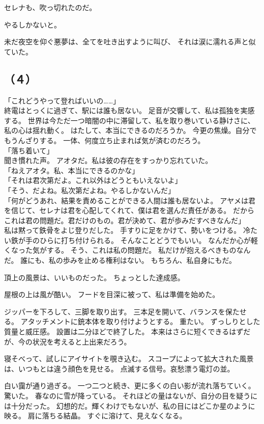 \documentclass[../IHMain]{subfiles}
\begin{document}
セレナも、吹っ切れたのだ。

やるしかないと。

未だ夜空を仰ぐ悪夢は、全てを吐き出すように叫び、
それは涙に濡れる声と似ていた。

\subsection*{（４）}
「これどうやって登ればいいの……」\\
終電はとっくに過ぎて、駅には誰も居ない。
足音が交響して、私は孤独を実感する。
世界は今ただ一つ暗闇の中に滞留して、私を取り巻いている静けさに、
私の心は揺れ動く。
はたして、本当にできるのだろうか。
今更の焦燥。自分でもうんざりする。
一体、何度立ち止まれば気が済むのだろう。\\
「落ち着いて」\\
聞き慣れた声。
アオタだ。私は彼の存在をすっかり忘れていた。\\
「ねえアオタ。私、本当にできるのかな」\\
「それは君次第だよ。これ以外はどうともいえないよ」\\
「そう、だよね。私次第だよね。やるしかないんだ」\\
「何がどうあれ、結果を責めることができる人間は誰も居ないよ。
アヤメは君を信じて、セレナは君を心配してくれて、僕は君を選んだ責任がある。
だからこれは君の問題だ。君だけのもの。君が決めて、君が歩みだすべきなんだ」\\
私は黙って鉄骨をよじ登りだした。
手すりに足をかけて、勢いをつける。
冷たい鉄が手のひらに打ち付けられる。
そんなことどうでもいい。
なんだか心が軽くなった気がする。
そう、これは私の問題だ。
私だけが抱えるべきものなんだ。
誰にも、私の歩みを止める権利はない。
もちろん、私自身にもだ。

頂上の風景は、いいものだった。
ちょっとした達成感。

屋根の上は風が酷い。
フードを目深に被って、私は準備を始めた。

ジッパーを下ろして、三脚を取り出す。
三本足を開いて、バランスを保たせる。
アタッチメントに銃本体を取り付けようとする。
重たい。
ずっしりとした質量と威圧感。
設置は二分ほどで終了した。
本来はさらに短くできるはずだが、今の状況を考えると上出来だろう。

寝そべって、試しにアイサイトを覗き込む。
スコープによって拡大された風景は、いつもとは違う顔色を見せる。
点滅する信号。哀愁漂う電灯の並。

白い靄が通り過ぎる。
一つ二つと続き、更に多くの白い影が流れ落ちていく。
驚いた。
春なのに雪が降っている。
それほどの量はないが、自分の目を疑うには十分だった。
幻想的だ。輝くわけでもないが、私の目にはどこか星のように映る。
肩に落ちる結晶。
すぐに溶けて、見えなくなる。
\end{document}
